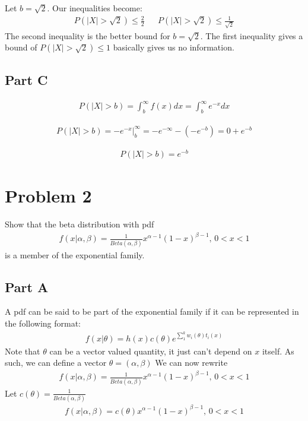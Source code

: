 \documentclass{article}
\begin{document}
Let $b=\sqrt{2}$. Our inequalities become:
\begin{align*}
P(|X|>\sqrt{2}) \leq \frac{2}{2} && P(|X|>\sqrt{2}) \leq \frac{1}{\sqrt{2}}
\end{align*}
The second inequality is the better bound for $b=\sqrt{2}$. The first inequality gives a bound of $P(|X|>\sqrt{2}) \leq 1$ basically gives us no information.
\subsection*{Part C}
\begin{align*}
P(|X|>b) = \int_{b}^{\infty} f(x) dx = \int_{b}^{\infty} e^{-x} dx
\end{align*}

\begin{align*}
P(|X|>b) = -e^{-x}|_{b}^{\infty} = -e^{-\infty} - (-e^{-b}) = 0 + e^{-b}
\end{align*}

\begin{align*}
\boxed{P(|X|>b) = e^{-b}}
\end{align*}


\pagebreak
\section*{Problem 2}
Show that the beta distribution with pdf
\begin{align*}
f(x|\alpha,\beta) = \frac{1}{Beta(\alpha,\beta)} x^{\alpha-1} (1-x)^{\beta-1} \text{, } 0<x<1
\end{align*}
is a member of the exponential family.

\subsection*{Part A}
A pdf can be said to be part of the exponential family if it can be represented in the following format:
\begin{align*}
f(x|\theta) = h(x) c(\theta) e^{\sum_{1}^{k} w_i(\theta) t_i(x)}
\end{align*}
Note that $\theta$ can be a vector valued quantity, it just can't depend on $x$ itself. As such, we can define a vector $\theta = (\alpha, \beta)$
We can now rewrite 
\begin{align*}
f(x|\alpha,\beta) = \frac{1}{Beta(\alpha,\beta)} x^{\alpha-1} (1-x)^{\beta-1} \text{, } 0<x<1
\end{align*}
Let $c(\theta) = \frac{1}{Beta(\alpha,\beta)}$
\begin{align*}
f(x|\alpha,\beta) = c(\theta) x^{\alpha-1} (1-x)^{\beta-1} \text{, } 0<x<1
\end{align*}
\end{document}
